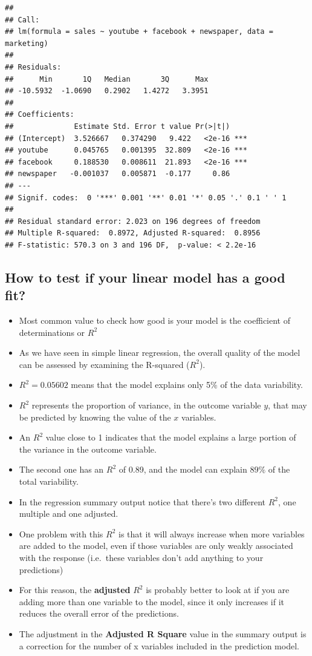 \documentclass[]{book}
\begin{document}
\begin{verbatim}
## 
## Call:
## lm(formula = sales ~ youtube + facebook + newspaper, data = marketing)
## 
## Residuals:
##      Min       1Q   Median       3Q      Max 
## -10.5932  -1.0690   0.2902   1.4272   3.3951 
## 
## Coefficients:
##              Estimate Std. Error t value Pr(>|t|)    
## (Intercept)  3.526667   0.374290   9.422   <2e-16 ***
## youtube      0.045765   0.001395  32.809   <2e-16 ***
## facebook     0.188530   0.008611  21.893   <2e-16 ***
## newspaper   -0.001037   0.005871  -0.177     0.86    
## ---
## Signif. codes:  0 '***' 0.001 '**' 0.01 '*' 0.05 '.' 0.1 ' ' 1
## 
## Residual standard error: 2.023 on 196 degrees of freedom
## Multiple R-squared:  0.8972, Adjusted R-squared:  0.8956 
## F-statistic: 570.3 on 3 and 196 DF,  p-value: < 2.2e-16
\end{verbatim}

\hypertarget{how-to-test-if-your-linear-model-has-a-good-fit}{%
\subsection{How to test if your linear model has a good fit?}\label{how-to-test-if-your-linear-model-has-a-good-fit}}

\begin{itemize}
\item
  Most common value to check how good is your model is the coefficient of determinations or \(R^2\)
\item
  As we have seen in simple linear regression, the overall quality of the model can be assessed by examining the R-squared (\(R^2\)).
\item
  \(R^2=0.05602\) means that the model explains only 5\% of the data variability.
\item
  \(R^2\) represents the proportion of variance, in the outcome variable \(y\), that may be predicted by knowing the value of the \(x\) variables.
\item
  An \(R^2\) value close to 1 indicates that the model explains a large portion of the variance in the outcome variable.
\item
  The second one has an \(R^2\) of 0.89, and the model can explain \(89\%\) of the total variability.
\item
  In the regression summary output notice that there's two different \(R^2\), one multiple and one adjusted.
\item
  One problem with this \(R^2\) is that it will always increase when more variables are added to the model, even if those variables are only weakly associated with the response (i.e.~these variables don't add anything to your predictions)
\item
  For this reason, the \textbf{adjusted} \(R^2\) is probably better to look at if you are adding more than one variable to the model, since it only increases if it reduces the overall error of the predictions.
\item
  The adjustment in the \textbf{Adjusted R Square} value in the summary output is a correction for the number of x variables included in the prediction model.
\end{itemize}
\end{document}
